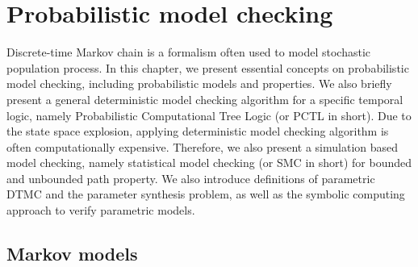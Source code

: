 \chapter{Probabilistic model checking}
Discrete-time Markov chain is a formalism often used to model stochastic population process. In this
chapter, we present essential concepts on probabilistic model checking, including probabilistic
models and properties. We also briefly present a general deterministic model checking algorithm for
a specific temporal logic, namely Probabilistic Computational Tree Logic (or PCTL in short). Due to
the state space explosion, applying deterministic model checking algorithm is often computationally
expensive. Therefore, we also present a simulation based model checking, namely statistical model
checking (or SMC in short) for bounded and unbounded path property. We also introduce definitions
of parametric DTMC and the parameter synthesis problem, as well as the symbolic computing approach to
verify parametric models.


\section{Markov models}
